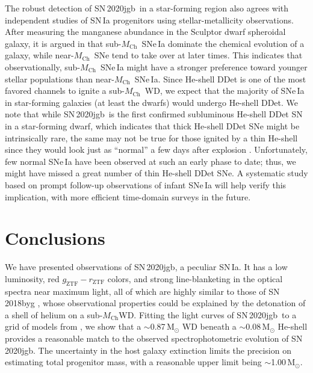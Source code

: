 \documentclass[twocolumn]{aastex631}
\newcommand{\sn}{SN\,2020jgb}
\newcommand{\Mch}{$M_\mathrm{Ch}$}
\begin{document}
The robust detection of \sn\ in a star-forming region also agrees with independent studies of SN\,Ia progenitors using stellar-metallicity observations. After measuring the manganese abundance in the Sculptor dwarf spheroidal galaxy, it is argued in \citet{de_los_reyes_manganese_2020} that sub-\Mch\ SNe\,Ia dominate the chemical evolution of a galaxy, while near-\Mch\ SNe tend to take over at later times. This indicates that observationally, sub-\Mch\ SNe\,Ia might have a stronger preference toward younger stellar populations than near-\Mch\ SNe\,Ia.
Since He-shell DDet is one of the most favored channels to ignite a sub-\Mch\ WD, we expect that the majority of SNe\,Ia in star-forming galaxies (at least the dwarfs) would undergo He-shell DDet. We note that while \sn\ is the first confirmed subluminous He-shell DDet SN in a star-forming dwarf, which indicates that thick He-shell DDet SNe might be intrinsically rare, the same may not be true for those ignited by a thin He-shell since they would look just as  ``normal'' a few days after explosion \citep{Magee_2021}. Unfortunately, few normal SNe\,Ia have been observed at such an early phase to date; thus, we might have missed a great number of thin He-shell DDet SNe. A systematic study based on prompt follow-up observations of infant SNe\,Ia will help verify this implication, with more efficient time-domain surveys in the future.

\section{Conclusions} \label{sec:conclusion}
We have presented observations of \sn, a peculiar SN\,Ia. It has a low luminosity, red $g_\mathrm{ZTF}-r_\mathrm{ZTF}$ colors, and strong line-blanketing in the optical spectra near maximum light, all of which are highly similar to those of SN\,2018byg \citep{de_18byg_2019}, whose observational properties could be explained by the detonation of a shell of helium on a sub-\Mch WD. Fitting the light curves of \sn\ to a grid of models from \citet{polin_observational_2019}, we show that a $\sim$0.87\,$\mathrm{M_\odot}$ WD beneath a $\sim$0.08\,$\mathrm{M_\odot}$ He-shell provides a reasonable match to the observed spectrophotometric evolution of \sn. The uncertainty in the host galaxy extinction limits the precision on estimating total progenitor mass, with a reasonable upper limit being $\sim$1.00\,$\mathrm{M_\odot}$.
\end{document}
